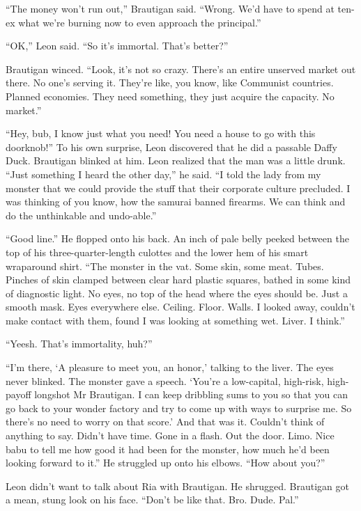 “The money won't run out,” Brautigan said. “Wrong. We'd have to 
spend at ten-ex what we're burning now to even approach the 
principal.”

“OK,” Leon said. “So it's immortal. That's better?”

Brautigan winced. “Look, it's not so crazy. There's an entire 
unserved market out there. No one's serving it. They're like, you know, 
like Communist countries. Planned economies. They need something, they 
just acquire the capacity. No market.”

“Hey, bub, I know just what you need! You need a house to go with 
this doorknob!” To his own surprise, Leon discovered that he did a 
passable Daffy Duck. Brautigan blinked at him. Leon realized that the 
man was a little drunk. “Just something I heard the other day,” he 
said. “I told the lady from my monster that we could provide the 
stuff that their corporate culture precluded. I was thinking of you 
know, how the samurai banned firearms. We can think and do the 
unthinkable and undo-able.”

“Good line.” He flopped onto his back. An inch of pale belly peeked 
between the top of his three-quarter-length culottes and the lower hem 
of his smart wraparound shirt. “The monster in the vat. Some skin, 
some meat. Tubes. Pinches of skin clamped between clear hard plastic 
squares, bathed in some kind of diagnostic light. No eyes, no top of 
the head where the eyes should be. Just a smooth mask. Eyes everywhere 
else. Ceiling. Floor. Walls. I looked away, couldn't make contact with 
them, found I was looking at something wet. Liver. I think.”

“Yeesh. That's immortality, huh?”

“I'm there, `A pleasure to meet you, an honor,' talking to the liver. 
The eyes never blinked. The monster gave a speech. `You're a 
low-capital, high-risk, high-payoff longshot Mr Brautigan. I can keep 
dribbling sums to you so that you can go back to your wonder factory 
and try to come up with ways to surprise me. So there's no need to 
worry on that score.' And that was it. Couldn't think of anything to 
say. Didn't have time. Gone in a flash. Out the door. Limo. Nice babu 
to tell me how good it had been for the monster, how much he'd been 
looking forward to it.” He struggled up onto his elbows. “How about 
you?”

Leon didn't want to talk about Ria with Brautigan. He shrugged. 
Brautigan got a mean, stung look on his face. “Don't be like that. 
Bro. Dude. Pal.”

